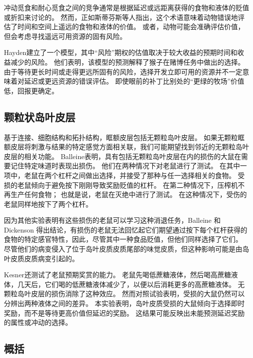 冲动觅食和耐心觅食之间的竞争通常是根据延迟或远距离获得的食物和液体的贬值或折扣来讨论的。
然而，正如斯蒂芬斯等人\cite{stephens2004impulsiveness}指出，这个术语意味着动物错误地评估了时间和空间上遥远的食物和液体的价值。
或者，动物可能会准确评估价值，但会考虑寻找遥远可用资源的固有风险。 \par


Hayden\cite{hayden2007temporal}建立了一个模型，其中“风险”期权的估值取决于较大收益的预期时间和收益减少的风险。
他们表明，该模型的预测解释了猴子在赌博任务中做出的选择。
由于等待更长时间或走得更远所固有的风险，选择开发立即可用的资源并不一定意味着对延迟或更远资源的错误评估。
即使眼前的补丁比别处的“更绿的牧场”价值低，回报更确定。



\subsection{颗粒状岛叶皮层}

基于连接、细胞结构和拓扑结构，眶额皮层包括无颗粒岛叶皮层\cite{carmichael1994architectonic}。
如果无颗粒眶额皮层将刺激与结果的特定感觉方面相关联，我们可能期望找到邻近的无颗粒岛叶皮层的相关功能。
Balleine\cite{balleine2000effect}表明，具有包括无颗粒岛叶皮层在内的损伤的大鼠在需要记住特定味道时表现出损伤。
他们在两种情况下对老鼠进行了测试。
在其中一项中，老鼠在两个杠杆之间做出选择，并接受了那种与任一选择相关的食物。
受损的老鼠倾向于避免按下刚刚导致奖励贬值的杠杆。
在第二种情况下，压榨机不再生产任何食物；
也就是说，老鼠在灭绝中进行了测试。
在这种情况下，受伤的老鼠同样地按下了两个杠杆。\par


因为其他实验表明有这些损伤的老鼠可以学习这种消退任务，Balleine 和 Dickenson 得出结论，有损伤的老鼠无法回忆起它们期望通过按下每个杠杆获得的食物的特定感官特性，因此，尽管其中一种食品贬值，但他们同样选择了它们。
尽管他们的病变侵入了位于岛叶皮质皮质尾部的味觉皮质，但这种影响可能是由岛叶皮质皮质病变引起的。\par


Kesner\cite{kesner2007role}还测试了老鼠预期奖赏的能力。
老鼠先喝低蔗糖液体，然后喝高蔗糖液体，几天后，它们喝的低蔗糖液体减少了，以便以后消耗更多的高蔗糖液体。
无颗粒岛叶皮层的损伤消除了这种效应。
然而对照试验表明，受损的大鼠仍然可以分辨出两种液体之间的差异。
本实验表明，岛叶皮质受损的大鼠倾向于选择即时奖励，而不是等待更高价值但延迟的奖励。
这结果可能反映出未能预测延迟奖励的属性或冲动的选择。\par



\subsection{概括}

